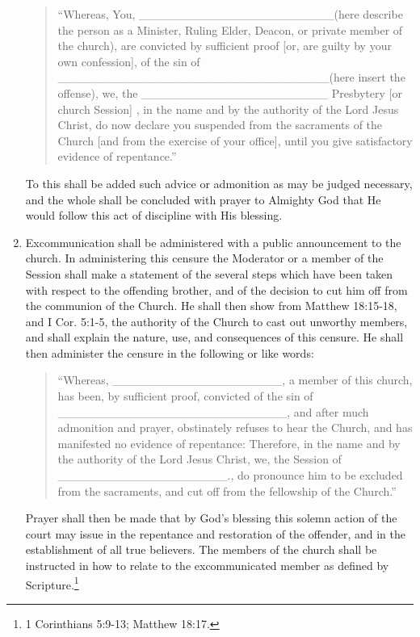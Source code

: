 \documentclass[
]{book}
\begin{document}
\begin{enumerate}
  \begin{quote}
  ``Whereas, You, \_\_\_\_\_\_\_\_\_\_\_\_\_\_\_\_\_\_\_\_\_\_\_(here describe the person as a Minister, Ruling Elder, Deacon, or private member of the church), are convicted by sufficient proof {[}or, are guilty by your own confession{]}, of the sin of \_\_\_\_\_\_\_\_\_\_\_\_\_\_\_\_\_\_\_\_\_\_\_\_\_\_\_\_\_\_\_\_(here insert the offense), we, the \_\_\_\_\_\_\_\_\_\_\_\_\_\_\_\_\_\_\_\_\_\_ Presbytery {[}or church Session{]} , in the name and by the authority of the Lord Jesus Christ, do now declare you suspended from the sacraments of the Church {[}and from the exercise of your office{]}, until you give satisfactory evidence of repentance.''
  \end{quote}

  To this shall be added such advice or admonition as may be judged necessary, and the whole shall be concluded with prayer to Almighty God that He would follow this act of discipline with His blessing.
\item
  Excommunication shall be administered with a public announcement to the church. In administering this censure the Moderator or a member of the Session shall make a statement of the several steps which have been taken with respect to the offending brother, and of the decision to cut him off from the communion of the Church. He shall then show from Matthew 18:15-18, and I Cor. 5:1-5, the authority of the Church to cast out unworthy members, and shall explain the nature, use, and consequences of this censure. He shall then administer the censure in the following or like words:

  \begin{quote}
  ``Whereas, \_\_\_\_\_\_\_\_\_\_\_\_\_\_\_\_\_\_\_\_, a member of this church, has been, by sufficient proof, convicted of the sin of \_\_\_\_\_\_\_\_\_\_\_\_\_\_\_\_\_\_\_\_\_\_\_\_\_\_\_, and after much admonition and prayer, obstinately refuses to hear the Church, and has manifested no evidence of repentance: Therefore, in the name and by the authority of the Lord Jesus Christ, we, the Session of \_\_\_\_\_\_\_\_\_\_\_\_\_\_\_\_\_\_\_\_., do pronounce him to be excluded from the sacraments, and cut off from the fellowship of the Church.''
  \end{quote}

  Prayer shall then be made that by God's blessing this solemn action of the court may issue in the repentance and restoration of the offender, and in the establishment of all true believers. The members of the church shall be instructed in how to relate to the excommunicated member as defined by Scripture.\footnote{1 Corinthians 5:9-13; Matthew 18:17.}
\end{enumerate}
\end{document}
